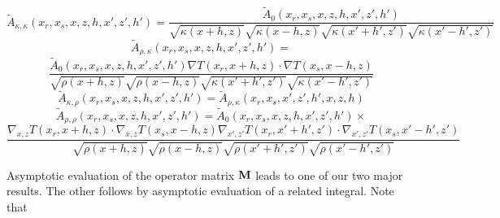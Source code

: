 \begin{equation}
\label{eqn:grt2dcoeff2}
\tilde{A}_{\kappa,\kappa}(x_r,x_s,x,z,h,x',z',h') = 
\frac{\tilde{A}_0(x_r,x_s,x,z,h,x',z',h')}{\sqrt{\kappa(x+h,z)}\sqrt{\kappa(x-h,z)}\sqrt{\kappa(x'+h',z')}\sqrt{\kappa(x'-h',z')}}
\end{equation}
\[
\tilde{A}_{\rho,\kappa}(x_r,x_s,x,z,h,x',z',h') =
\]
\begin{equation}
\label{eqn:grt2dcoeff3}
\frac{\tilde{A}_0(x_r,x_s,x,z,h,x',z',h')\nabla T(x_r,x+h,z)
\cdot\nabla T(x_s,x-h,z)}
{\sqrt{\rho(x+h,z)}\sqrt{\rho(x-h,z)}\sqrt{\kappa(x'+h',z')}\sqrt{\kappa(x'-h',z')}}
\end{equation}
\begin{equation}
\label{eqn:grt2dcoeff4}
\tilde{A}_{\kappa,\rho}(x_r,x_s,x,z,h,x',z',h') =
\tilde{A}_{\rho,\kappa}(x_r,x_s,x',z',h',x,z,h)
\end{equation}
\[
\tilde{A}_{\rho,\rho}(x_r,x_s,x,z,h,x',z',h') =\tilde{A}_0(x_r,x_s,x,z,h,x',z',h') \times
\]
\begin{equation}
\label{eqn:grt2dcoeff5}
\frac{ \nabla_{x,z}  T(x_r,x+h,z)\cdot\nabla_{x,z}  T(x_s,x-h,z)
\nabla_{x',z'} T(x_r,x'+h',z')\cdot \nabla_{x',z'}T(x_s,x'-h',z')}
{\sqrt{\rho(x+h,z)}\sqrt{\rho(x-h,z)}\sqrt{\rho(x'+h',z')}\sqrt{\rho(x'-h',z')}}
\end{equation}

Asymptotic evaluation of the operator matrix $\bf{M}$ leads to one of
our two major results. The other follows by asymptotic evaluation of a
related integral. Note that

